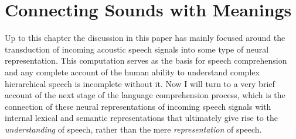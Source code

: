 \documentclass[titlepage]{article}
\begin{document}
\section{Connecting Sounds with Meanings} \label{meaning}

  Up to this chapter the discussion in this paper has mainly focused around the transduction of incoming
  acoustic speech signals into some type of neural representation. This computation serves as the basis
  for speech comprehension and any complete account of the human ability to understand complex hierarchical
  speech is incomplete without it. Now I will turn to a very brief account of the next stage of the
  language comprehension process, which is the connection of these neural representations of incoming
  speech signals with internal lexical and semantic representations that ultimately give rise to the
  \textit{understanding} of speech, rather than the mere \textit{representation} of speech.

\newpage
\printbibliography
\end{document}
